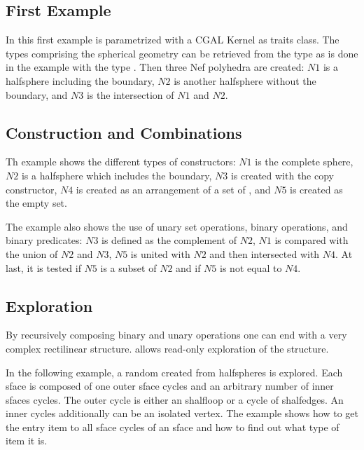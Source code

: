 \subsection{First Example}

In this first example  is parametrized with a CGAL
Kernel as traits class. The types comprising the spherical geometry can be
retrieved from the type  as is done in the example 
with the type
. Then three Nef polyhedra are created: $N1$ is a halfsphere
including the boundary, $N2$ is another halfsphere without the boundary, and 
$N3$ is the intersection of $N1$ and $N2$. 


\subsection{Construction and Combinations}

Th example shows the different types of constructors: $N1$ is the complete
sphere, $N2$ is a halfsphere which includes the boundary, $N3$ is created
with the copy constructor, $N4$ is created as an arrangement of a set
of , and $N5$ is created as the empty set.

The example also shows the use of unary set operations, binary operations, 
and binary predicates: $N3$ is defined as the complement of $N2$, $N1$ is
compared with the union of $N2$ and $N3$, $N5$ is united with $N2$ and then
intersected with $N4$. At last, it is tested if $N5$ is a subset of $N2$ and
if $N5$ is not equal to $N4$. 


\subsection{Exploration}

By recursively composing binary and unary operations one can end with
a very complex rectilinear structure.  allows 
read-only exploration of the structure.

In the following example, a random  created from
 halfspheres is explored. Each sface is composed of one outer 
sface cycles and an arbitrary number of inner sfaces cycles. The outer cycle
is either an shalfloop or a cycle of shalfedges. An inner cycles additionally
can be an isolated vertex. The example shows how to get the entry item 
to all sface cycles of an sface  and how to find out what type of item
it is. 


